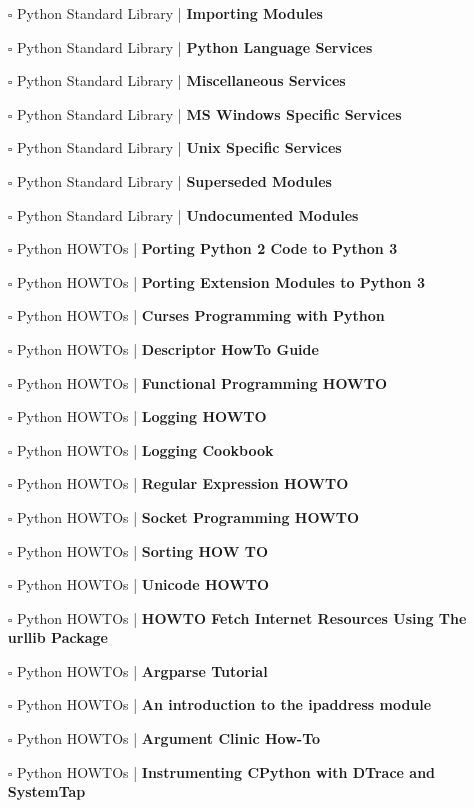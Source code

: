 \documentclass[a4, landscape, 12pt]{article}
\newcommand{\checkbox}{$\square$}%
\begin{document}
\begin{itemize}
{}
\item [\checkbox]  Python Standard Library | \textbf{ Importing Modules
}
\item [\checkbox]  Python Standard Library | \textbf{ Python Language Services
}
\item [\checkbox]  Python Standard Library | \textbf{ Miscellaneous Services
}
\item [\checkbox]  Python Standard Library | \textbf{ MS Windows Specific Services
}
\item [\checkbox]  Python Standard Library | \textbf{ Unix Specific Services
}
\item [\checkbox]  Python Standard Library | \textbf{ Superseded Modules
}
\item [\checkbox]  Python Standard Library | \textbf{ Undocumented Modules
}
\item [\checkbox]  Python HOWTOs  | \textbf{ Porting Python 2 Code to Python 3
}
\item [\checkbox]  Python HOWTOs  | \textbf{ Porting Extension Modules to Python 3
}
\item [\checkbox]  Python HOWTOs  | \textbf{ Curses Programming with Python
}
\item [\checkbox]  Python HOWTOs  | \textbf{ Descriptor HowTo Guide
}
\item [\checkbox]  Python HOWTOs  | \textbf{ Functional Programming HOWTO
}
\item [\checkbox]  Python HOWTOs  | \textbf{ Logging HOWTO
}
\item [\checkbox]  Python HOWTOs  | \textbf{ Logging Cookbook
}
\item [\checkbox]  Python HOWTOs  | \textbf{ Regular Expression HOWTO
}
\item [\checkbox]  Python HOWTOs  | \textbf{ Socket Programming HOWTO
}
\item [\checkbox]  Python HOWTOs  | \textbf{ Sorting HOW TO
}
\item [\checkbox]  Python HOWTOs  | \textbf{ Unicode HOWTO
}
\item [\checkbox]  Python HOWTOs  | \textbf{ HOWTO Fetch Internet Resources Using The urllib Package
}
\item [\checkbox]  Python HOWTOs  | \textbf{ Argparse Tutorial
}
\item [\checkbox]  Python HOWTOs  | \textbf{ An introduction to the ipaddress module
}
\item [\checkbox]  Python HOWTOs  | \textbf{ Argument Clinic How-To
}
\item [\checkbox]  Python HOWTOs  | \textbf{ Instrumenting CPython with DTrace and SystemTap
}
\end{itemize}
\end{document}
